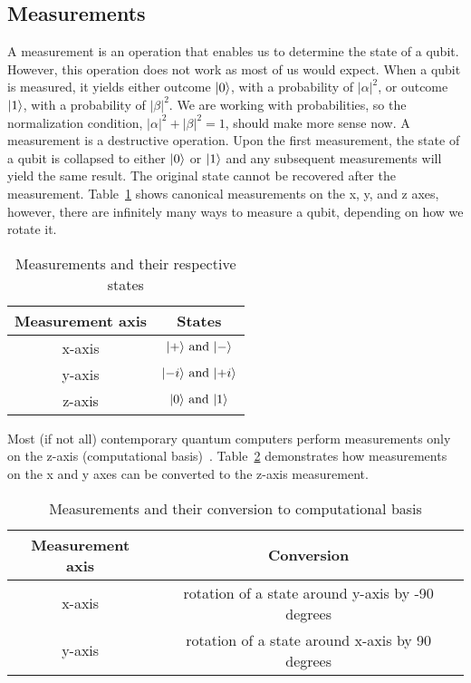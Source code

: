 \tocless\subsection{Measurements}\noindent
A measurement is an operation that enables us to determine the state of a qubit. However, this operation does not work as most of us would expect. When a qubit is measured, it yields either outcome $\lvert0\rangle$, with a probability of $\lvert \alpha \rvert^2$, or outcome $\lvert1\rangle$, with a probability of $\lvert \beta \rvert^2$. We are working with probabilities, so the normalization condition, $\lvert \alpha \rvert^2 + \lvert \beta \rvert^2 = 1$, should make more sense now. A measurement is a destructive operation. Upon the first measurement, the state of a qubit is collapsed to either $\lvert0\rangle$ or $\lvert1\rangle$ and any subsequent measurements will yield the same result. The original state cannot be recovered after the measurement. Table~\ref{tab:measurements-states} shows canonical measurements on the x, y, and z axes, however, there are infinitely many ways to measure a qubit, depending on how we rotate it.

\begin{table}[H]
  \centering
  \begin{tabular}{|c|c|} 
      \hline
      \multicolumn{1}{|c|}{\textbf{Measurement axis}} & \textbf{States}\\
      \hline
      x-axis & $\lvert+\rangle \text{ and }\lvert-\rangle$\\ 
      \hline
      y-axis & $\lvert-i\rangle \text{ and }\lvert+i\rangle$\\ 
      \hline
      z-axis & $\lvert0\rangle \text{ and }\lvert1\rangle$\\ 
      \hline
  \end{tabular}
  \caption{Measurements and their respective states}
  \label{tab:measurements-states}
\end{table}
Most (if not all) contemporary quantum computers perform measurements only on the z-axis (computational basis)~\cite{blog}. Table~\ref{tab:measurements-conversion} demonstrates how measurements on the x and y axes can be converted to the z-axis measurement.
\begin{table}[H]
  \centering
  \begin{tabular}{|c|c|} 
      \hline
      \multicolumn{1}{|c|}{\textbf{Measurement axis}} & \textbf{Conversion}\\
      \hline
      x-axis & rotation of a state around y-axis by -90 degrees \\ 
      \hline
      y-axis & rotation of a state around x-axis by 90 degrees \\ 
      \hline
  \end{tabular}
  \caption{Measurements and their conversion to computational basis}
  \label{tab:measurements-conversion}
\end{table}

